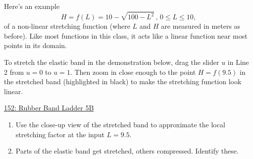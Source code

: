 \documentclass{ximera}
\begin{document}
\begin{example} \label{Ex:JDJFHDtet434t}
Here's an example
\[
      H = f(L) = 10 - \sqrt{100-L^2} \, , \, 0\leq L \leq 10,
\] 
of a non-linear stretching function (where $L$ and $H$ are measured in meters as before). Like most functions in this class, it acts like a linear function near most points in its domain. 

To stretch the elastic band in the demonstration below, drag the slider $u$ in Line 2 from $u=0$ to $u=1$. Then zoom in close enough to the point $H=f(9.5)$ in the stretched band (highlighted in black) to make the stretching function look linear. %


\begin{onlineOnly}
    \begin{center}
\end{center}
\end{onlineOnly}

\href{https://www.desmos.com/calculator/xk8dvcfgwi}{152: Rubber Band Ladder 5B}


\begin{enumerate}

\item Use the close-up view of the stretched band to approximate the local stretching factor at the input $L=9.5$.


\item Parts of the elastic band get stretched, others compressed. Identify these.
\end{enumerate}






\end{example}
\end{document}
